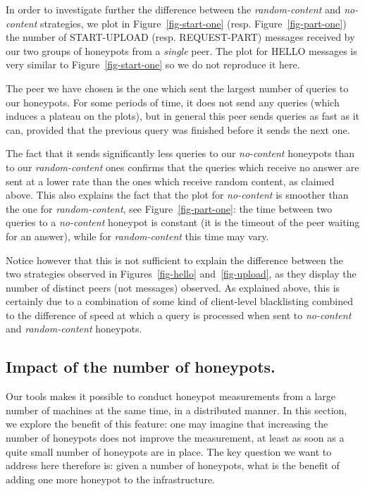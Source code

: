 \documentclass[final,
notitlepage,
narroweqnarray,
	inline,
	twoside,
]{ieee}
\begin{document}
In order to investigate further the difference between the {\em
  random-content} and {\em no-content} strategies, we plot in
Figure~\ref{fig-start-one} (resp. Figure~\ref{fig-part-one}) the
number of START-UPLOAD (resp. REQUEST-PART) messages received by our
two groups of honeypots from a {\em single} peer. The plot for HELLO
messages is very similar to Figure~\ref{fig-start-one} so we do not
reproduce it here.

The peer we have chosen is the one which sent the largest number of queries to our honeypots. For some periods of time, it does not send any queries (which induces a plateau on the plots), but in general this peer sends queries as fast as it can, provided that the previous query was finished before it sends the next one.

The fact that it sends significantly less queries to our {\em no-content} honeypots than to our {\em random-content} ones confirms that the queries which receive no answer are sent at a lower rate than the ones which receive random content, as claimed above. This also explains the fact that the plot for {\em no-content} is smoother than the one for {\em random-content}, see Figure~\ref{fig-part-one}: the time between two queries to a {\em no-content} honeypot is constant (it is the timeout of the peer waiting for an answer), while for {\em random-content} this time may vary.

Notice however that this is not sufficient to explain the difference between the two strategies observed in Figures~\ref{fig-hello} and~\ref{fig-upload}, as they display the number of distinct peers (not messages) observed. As explained above, this is certainly due to a combination of some kind of client-level blacklisting combined to the difference of speed at which a query is processed when sent to {\em no-content} and {\em random-content} honeypots.

\subsection{Impact of the number of honeypots.}
\label{sec-nbhoneypots}

Our tools makes it possible to conduct honeypot measurements from a large number of machines at the same time, in a distributed manner. In this section, we explore the benefit of this feature: one may imagine that increasing the number of honeypots does not improve the measurement, at least as soon as a quite small number of honeypots are in place. The key question we want to address here therefore is: given a number  of honeypots, what is the benefit of adding one more honeypot to the infrastructure.
\end{document}
